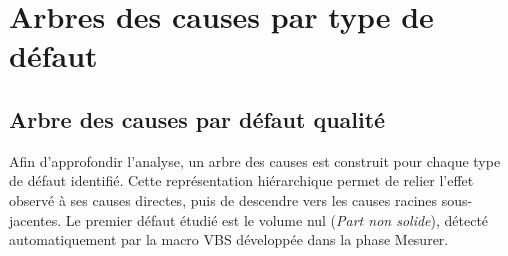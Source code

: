 \section{Arbres des causes par type de défaut}
\label{sec:arbres-causes}

\subsection{Arbre des causes par défaut qualité}
\label{subsec:arbre-causes}

Afin d'approfondir l'analyse, un arbre des causes est construit pour chaque type de défaut identifié. Cette représentation hiérarchique permet de relier l'effet observé à ses causes directes, puis de descendre vers les causes racines sous-jacentes. Le premier défaut étudié est le volume nul (\textit{Part non solide}), détecté automatiquement par la macro VBS développée dans la phase Mesurer.


